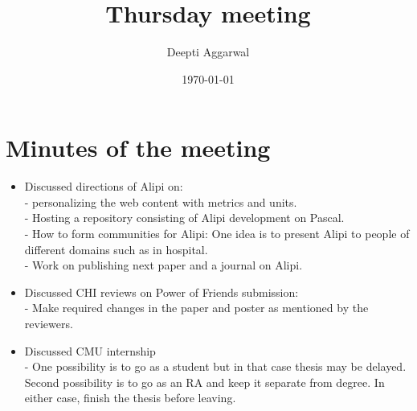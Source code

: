 \documentclass[11pt]{article}
\title{Thursday meeting}
\author{Deepti Aggarwal}
\date{\today}
\begin{document}
\maketitle

\setcounter{tocdepth}{3}
\vspace*{1cm}
\section{Minutes of the meeting}
\label{sec-1}
\begin{itemize}
\item Discussed directions of Alipi on: \\
- personalizing the web content with metrics and units. \\
- Hosting a repository consisting of Alipi development on Pascal. \\
- How to form communities for Alipi: One idea is to present Alipi to people of different domains such as in hospital. \\
- Work on publishing next paper and a journal on Alipi. \\

\item Discussed CHI reviews on Power of Friends submission:\\
- Make required changes in the paper and poster as mentioned by the reviewers.

\item Discussed CMU internship \\
- One possibility is to go as a student but in that case thesis may be delayed. Second possibility is to go as an RA and keep it separate from degree. In either case, finish the thesis before leaving.


\end{itemize}
\end{document}

